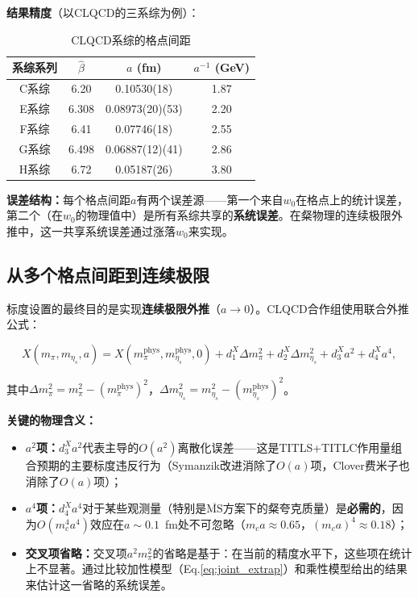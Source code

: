 \documentclass[12pt,a4paper]{ctexart}
\theoremstyle{definition}
\begin{document}
\textbf{结果精度}（以CLQCD的三系综为例\cite{CLQCD2025quark_mass}）：

\begin{table}[H]
\centering
\caption{CLQCD系综的格点间距\cite{CLQCD2025quark_mass,CLQCD2024charm}}
\label{tab:clqcd_spacings}
\begin{tabular}{cccc}
\toprule
系综系列 & $\hat{\beta}$ & $a$ (fm) & $a^{-1}$ (GeV) \\
\midrule
C系综 & 6.20  & 0.10530(18) & 1.87 \\
E系综 & 6.308 & 0.08973(20)(53) & 2.20 \\
F系综 & 6.41  & 0.07746(18) & 2.55 \\
G系综 & 6.498 & 0.06887(12)(41) & 2.86 \\
H系综 & 6.72  & 0.05187(26) & 3.80 \\
\bottomrule
\end{tabular}
\end{table}

\textbf{误差结构：}每个格点间距$a$有两个误差源——第一个来自$w_0$在格点上的统计误差，第二个（在$w_0$的物理值中）是所有系综共享的\textbf{系统误差}。在粲物理的连续极限外推中，这一共享系统误差通过涨落$w_0$来实现\cite{CLQCD2024charm}。

\subsection{从多个格点间距到连续极限}

标度设置的最终目的是实现\textbf{连续极限外推}（$a \to 0$）。CLQCD合作组使用联合外推公式\cite{CLQCD2024charm}：

\begin{equation}
\boxed{X(m_\pi, m_{\eta_s}, a) = X(m^{\text{phys}}_\pi, m^{\text{phys}}_{\eta_s}, 0) + d^X_1\Delta m^2_\pi + d^X_2\Delta m^2_{\eta_s} + d^X_3 a^2 + d^X_4 a^4},
\label{eq:joint_extrap}
\end{equation}

其中$\Delta m^2_\pi = m^2_\pi - (m^{\text{phys}}_\pi)^2$，$\Delta m^2_{\eta_s} = m^2_{\eta_s} - (m^{\text{phys}}_{\eta_s})^2$。

\textbf{关键的物理含义：}

\begin{itemize}
    \item \textbf{$a^2$项：}$d^X_3 a^2$代表主导的$O(a^2)$离散化误差——这是TITLS+TITLC作用量组合预期的主要标度违反行为（Symanzik改进消除了$O(a)$项，Clover费米子也消除了$O(a)$项）；

    \item \textbf{$a^4$项：}$d^X_4 a^4$对于某些观测量（特别是$\overline{\text{MS}}$方案下的粲夸克质量）是\textbf{必需的}\cite{CLQCD2024charm}，因为$O(m^4_c a^4)$效应在$a \sim 0.1$~fm处不可忽略（$m_c a \approx 0.65$，$(m_c a)^4 \approx 0.18$）；

    \item \textbf{交叉项省略：}交叉项$a^2 m^2_\pi$的省略是基于：在当前的精度水平下，这些项在统计上不显著。通过比较加性模型（Eq.\ref{eq:joint_extrap}）和乘性模型给出的结果来估计这一省略的系统误差。
\end{itemize}
\end{document}
